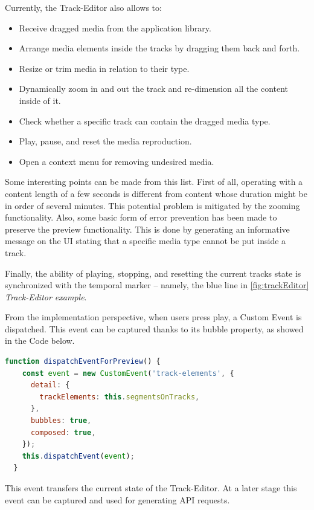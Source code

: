 Currently, the Track-Editor also allows to:

\begin{itemize}
\item Receive dragged media from the application library.
\item Arrange media elements inside the tracks by dragging them back and forth.
\item Resize or trim media in relation to their type.
\item Dynamically zoom in and out the track and re-dimension all the content inside of it.
\item Check whether a specific track can contain the dragged media type.
\item Play, pause, and reset the media reproduction.
\item Open a context menu for removing undesired media.
\end{itemize}

Some interesting points can be made from this list. First of all, operating with a content length of a few seconds is different from content whose duration might be in order of several minutes. This potential problem is mitigated by the zooming functionality. Also, some basic form of error prevention has been made to preserve the preview functionality. This is done by generating an informative message on the UI stating that a specific media type cannot be put inside a track.

Finally, the ability of playing, stopping, and resetting the current tracks state is synchronized with the temporal marker – namely, the blue line in \ref{fig:trackEditor} \emph{Track-Editor example}.

From the implementation perspective, when users press play, a Custom Event is dispatched. This event can be captured thanks to its bubble property, as showed in the Code below. 
\\
\begin{lstlisting}[caption={Track-Editor event dispatch},label={customEvent}, language=JavaScript]
function dispatchEventForPreview() {
    const event = new CustomEvent('track-elements', {
      detail: {
        trackElements: this.segmentsOnTracks,
      },
      bubbles: true,
      composed: true,
    });
    this.dispatchEvent(event);
  }
\end{lstlisting}

This event transfers the current state of the Track-Editor. At a later stage this event can be captured and used for generating API requests.

